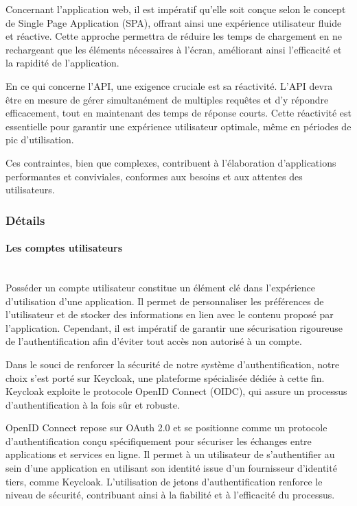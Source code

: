 Concernant l'application web, il est impératif qu'elle soit conçue selon le concept de Single Page Application (SPA), offrant ainsi une expérience utilisateur fluide et réactive. Cette approche permettra de réduire les temps de chargement en ne rechargeant que les éléments nécessaires à l'écran, améliorant ainsi l'efficacité et la rapidité de l'application.

En ce qui concerne l'API, une exigence cruciale est sa réactivité. L'API devra être en mesure de gérer simultanément de multiples requêtes et d'y répondre efficacement, tout en maintenant des temps de réponse courts. Cette réactivité est essentielle pour garantir une expérience utilisateur optimale, même en périodes de pic d'utilisation.

Ces contraintes, bien que complexes, contribuent à l'élaboration d'applications performantes et conviviales, conformes aux besoins et aux attentes des utilisateurs.


\subsubsection{Détails}

\paragraph{Les comptes utilisateurs}
~~\\

Posséder un compte utilisateur constitue un élément clé dans l'expérience d'utilisation d'une application. Il permet de personnaliser les préférences de l'utilisateur et de stocker des informations en lien avec le contenu proposé par l'application. Cependant, il est impératif de garantir une sécurisation rigoureuse de l'authentification afin d'éviter tout accès non autorisé à un compte.

Dans le souci de renforcer la sécurité de notre système d'authentification, notre choix s'est porté sur Keycloak, une plateforme spécialisée dédiée à cette fin. Keycloak exploite le protocole OpenID Connect (OIDC), qui assure un processus d'authentification à la fois sûr et robuste.

OpenID Connect repose sur OAuth 2.0 et se positionne comme un protocole d'authentification conçu spécifiquement pour sécuriser les échanges entre applications et services en ligne. Il permet à un utilisateur de s'authentifier au sein d'une application en utilisant son identité issue d'un fournisseur d'identité tiers, comme Keycloak. L'utilisation de jetons d'authentification renforce le niveau de sécurité, contribuant ainsi à la fiabilité et à l'efficacité du processus.

